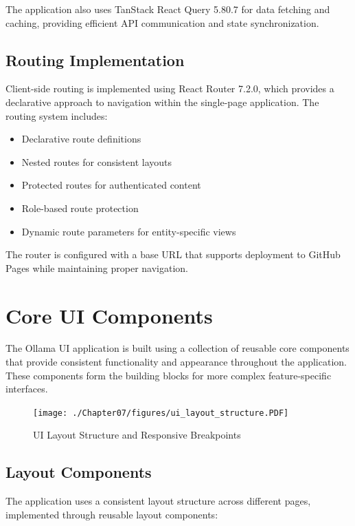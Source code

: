 The application also uses TanStack React Query 5.80.7 for data fetching and caching, providing efficient API communication and state synchronization.

\subsection{Routing Implementation}

Client-side routing is implemented using React Router 7.2.0, which provides a declarative approach to navigation within the single-page application. The routing system includes:

\begin{itemize}
  \item Declarative route definitions
  \item Nested routes for consistent layouts
  \item Protected routes for authenticated content
  \item Role-based route protection
  \item Dynamic route parameters for entity-specific views
\end{itemize}

The router is configured with a base URL that supports deployment to GitHub Pages while maintaining proper navigation.

\section{Core UI Components}

The Ollama UI application is built using a collection of reusable core components that provide consistent functionality and appearance throughout the application. These components form the building blocks for more complex feature-specific interfaces.

\begin{figure}
    \centering
    \texttt{[image: ./Chapter07/figures/ui\_layout\_structure.PDF]}
    \caption{UI Layout Structure and Responsive Breakpoints}
    \label{fig:ui-layout-structure}
\end{figure}
\clearpage

\subsection{Layout Components}

The application uses a consistent layout structure across different pages, implemented through reusable layout components:


